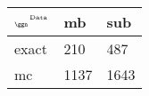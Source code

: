 \begin{tabular}{lll}
    \toprule
    $_{\text{\tiny{\ggn}}}$$^{\text{\tiny{Data}}}$ & mb & sub \\
    \midrule
    exact & 210
              & 487 \\
    mc   & 1137
              & 1643 \\
    \bottomrule
\end{tabular}